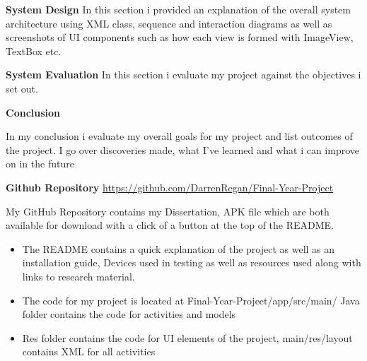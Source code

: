 \textbf {System Design}
In this section i provided an explanation of the overall system architecture using XML class, sequence and interaction diagrams as well as screenshots of UI components such as how each view is formed with ImageView, TextBox etc. \newline

\textbf {System Evaluation}
  In this section i evaluate my project against the objectives i set out. \newline

\textbf {Conclusion}

 In my conclusion i evaluate my overall goals for my project and list outcomes of the project. I go over discoveries made, what I've learned and what i can improve on in the future \newline

\textbf {Github Repository} \url{https://github.com/DarrenRegan/Final-Year-Project}
\newline

    My GitHub Repository contains my Dissertation, APK file which are both available for download with a click of a button at the top of the README. 
\begin{itemize}
     \item The README contains a quick explanation of the project as well as an installation guide, Devices used in testing as well as resources used along with links to research material.
         
     \item The code for my project is located at Final-Year-Project/app/src/main/
     Java folder contains the code for activities and models
     
    \item Res folder contains the code for UI elements of the project, \newline              main/res/layout contains XML for all activities
\end{itemize}
